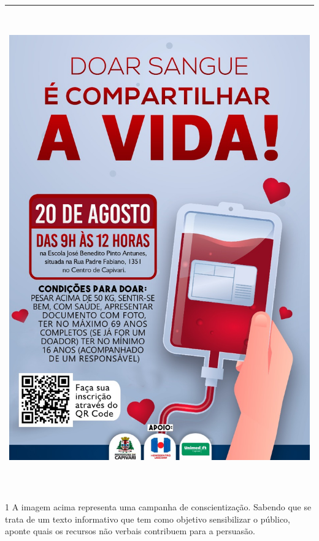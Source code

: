 \begin{longtable}[]{@{}l@{}}
\toprule
\endhead
\includegraphics[width=5.76042in,height=8.15278in]{./imgSAEB_7_POR/media/image1.png} \\
\bottomrule
\end{longtable}


\num{1} A imagem acima representa uma campanha de conscientização. Sabendo que se trata de um texto informativo que tem como objetivo sensibilizar o público, aponte quais os recursos não verbais contribuem para a persuasão.

